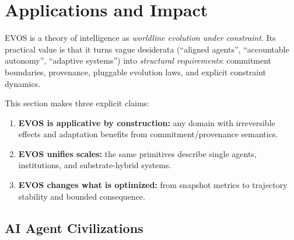 \documentclass[11pt]{article}
\begin{document}

\section{Applications and Impact}
\label{sec:applications}

EVOS is a theory of intelligence as \emph{worldline evolution under constraint}. Its practical
value is that it turns vague desiderata (``aligned agents'', ``accountable autonomy'',
``adaptive systems'') into \emph{structural requirements}: commitment boundaries, provenance,
pluggable evolution laws, and explicit constraint dynamics.

This section makes three explicit claims:

\begin{enumerate}
  \item \textbf{EVOS is applicative by construction:} any domain with irreversible effects and adaptation benefits from commitment/provenance semantics.
  \item \textbf{EVOS unifies scales:} the same primitives describe single agents, institutions, and substrate-hybrid systems.
  \item \textbf{EVOS changes what is optimized:} from snapshot metrics to trajectory stability and bounded consequence.
\end{enumerate}

\subsection{AI Agent Civilizations}
\end{document}
